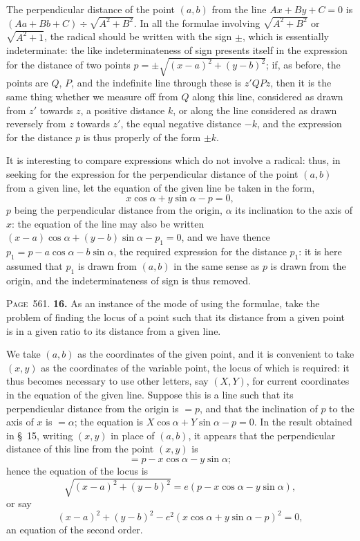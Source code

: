 \documentclass[11pt,a4paper]{book}
\begin{document}
The perpendicular distance of the point $(a,b)$ from the line $Ax+By+C=0$ is $(Aa+Bb+C)\div\sqrt{A^2+B^2}$. In all the formulae involving $\sqrt{A^2+B^2}$ or $\sqrt{A^2+1}$, the radical should be written with the sign $\pm$, which is essentially indeterminate: the like indeterminateness of sign presents itself in the expression for the distance of two points $p=\pm\sqrt{(x-a)^2+(y-b)^2}$; if, as before, the points are $Q$, $P$, and the indefinite line through these is $z'QPz$, then it is the same thing whether we measure off from $Q$ along this line, considered as drawn from $z'$ towards $z$, a positive distance $k$, or along the line considered as drawn reversely from $z$ towards $z'$, the equal negative distance $-k$, and the expression for the distance $p$ is thus properly of the form $\pm k$.

It is interesting to compare expressions which do not involve a radical: thus, in seeking for the expression for the perpendicular distance of the point $(a,b)$ from a given line, let the equation of the given line be taken in the form,
\[
x\cos\alpha + y\sin\alpha - p = 0,
\]
$p$ being the perpendicular distance from the origin, $\alpha$ its inclination to the axis of $x$: the equation of the line may also be written $(x-a)\cos\alpha+(y-b)\sin\alpha-p_1=0$, and we have thence $p_1=p-a\cos\alpha-b\sin\alpha$, the required expression for the distance $p_1$: it is here assumed that $p_1$ is drawn from $(a,b)$ in the same sense as $p$ is drawn from the origin, and the indeterminateness of sign is thus removed.

\newpage
\noindent\textsc{Page~561.} \textbf{16.} As an instance of the mode of using the formulae, take the problem of finding the locus of a point such that its distance from a given point is in a given ratio to its distance from a given line.

We take $(a,b)$ as the coordinates of the given point, and it is convenient to take $(x,y)$ as the coordinates of the variable point, the locus of which is required: it thus becomes necessary to use other letters, say $(X,Y)$, for current coordinates in the equation of the given line. Suppose this is a line such that its perpendicular distance from the origin is $=p$, and that the inclination of $p$ to the axis of $x$ is $=\alpha$; the equation is $X\cos\alpha+Y\sin\alpha-p=0$. In the result obtained in \S~15, writing $(x,y)$ in place of $(a,b)$, it appears that the perpendicular distance of this line from the point $(x,y)$ is
\[
=p-x\cos\alpha-y\sin\alpha;
\]
hence the equation of the locus is
\[
\sqrt{(x-a)^2+(y-b)^2} = e(p-x\cos\alpha-y\sin\alpha),
\]
or say
\[
(x-a)^2+(y-b)^2-e^2(x\cos\alpha+y\sin\alpha-p)^2=0,
\]
an equation of the second order.
\end{document}
